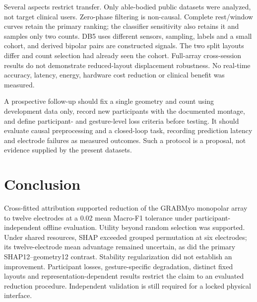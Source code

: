 Several aspects restrict transfer. Only able-bodied public datasets were analyzed, not target clinical users. Zero-phase filtering is non-causal. Complete rest/window curves retain the primary ranking; the classifier sensitivity also retains it and samples only two counts. DB5 uses different sensors, sampling, labels and a small cohort, and derived bipolar pairs are constructed signals. The two split layouts differ and count selection had already seen the cohort. Full-array cross-session results do not demonstrate reduced-layout displacement robustness. No real-time accuracy, latency, energy, hardware cost reduction or clinical benefit was measured.

A prospective follow-up should fix a single geometry and count using development data only, record new participants with the documented montage, and define participant- and gesture-level loss criteria before testing. It should evaluate causal preprocessing and a closed-loop task, recording prediction latency and electrode failures as measured outcomes. Such a protocol is a proposal, not evidence supplied by the present datasets.

\section{Conclusion}
Cross-fitted attribution supported reduction of the GRABMyo monopolar array to twelve electrodes at a 0.02 mean Macro-F1 tolerance under participant-independent offline evaluation. Utility beyond random selection was supported. Under shared resources, SHAP exceeded grouped permutation at six electrodes; its twelve-electrode mean advantage remained uncertain, as did the primary SHAP12--geometry12 contrast. Stability regularization did not establish an improvement. Participant losses, gesture-specific degradation, distinct fixed layouts and representation-dependent results restrict the claim to an evaluated reduction procedure. Independent validation is still required for a locked physical interface.
